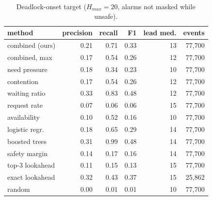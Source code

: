 \begin{table}[t]
\centering
\footnotesize
\caption{Deadlock-onset target ($H_{max}=20$, alarms not masked while unsafe).}
\label{tab:deadlock}
\begin{tabular}{lrrrrr}
\toprule
method & precision & recall & F1 & lead med. & events \\
\midrule
combined (ours) & 0.21 & 0.71 & 0.33 & 13 & 77{,}700 \\
combined, max & 0.17 & 0.54 & 0.26 & 12 & 77{,}700 \\
need pressure & 0.18 & 0.34 & 0.23 & 10 & 77{,}700 \\
contention & 0.17 & 0.54 & 0.26 & 12 & 77{,}700 \\
waiting ratio & 0.33 & 0.83 & 0.48 & 12 & 77{,}700 \\
request rate & 0.07 & 0.06 & 0.06 & 15 & 77{,}700 \\
availability & 0.10 & 0.52 & 0.16 & 10 & 77{,}700 \\
logistic regr. & 0.18 & 0.65 & 0.29 & 14 & 77{,}700 \\
boosted trees & 0.31 & 0.99 & 0.48 & 14 & 77{,}700 \\
safety margin & 0.14 & 0.17 & 0.16 & 14 & 77{,}700 \\
top-3 lookahead & 0.11 & 0.15 & 0.13 & 15 & 77{,}700 \\
exact lookahead & 0.32 & 0.43 & 0.37 & 15 & 25{,}862 \\
random & 0.00 & 0.01 & 0.01 & 10 & 77{,}700 \\
\bottomrule
\end{tabular}
\end{table}
